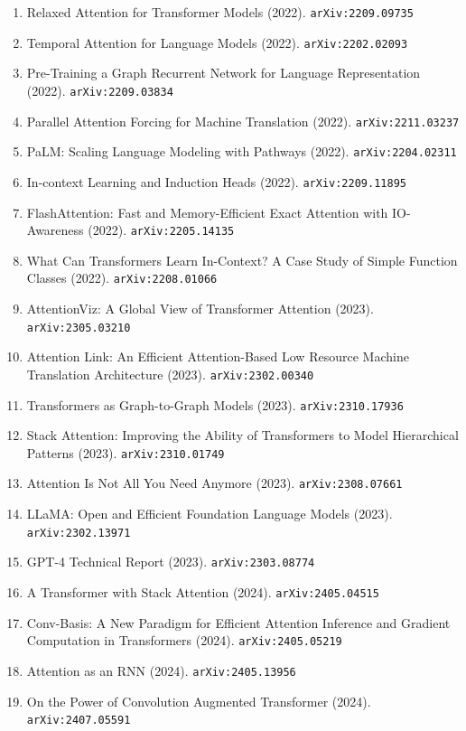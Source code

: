 \documentclass[11pt]{article}
\begin{document}
\begin{enumerate}
  Speech Translation (2022). \texttt{arXiv:2205.07100}
  \item Relaxed Attention for Transformer Models (2022). \texttt{arXiv:2209.09735}
  \item Temporal Attention for Language Models (2022). \texttt{arXiv:2202.02093}
  \item Pre-Training a Graph Recurrent Network for Language Representation (2022). \texttt{arXiv:2209.03834}
  \item Parallel Attention Forcing for Machine Translation (2022). \texttt{arXiv:2211.03237}
  \item PaLM: Scaling Language Modeling with Pathways (2022). \texttt{arXiv:2204.02311}
  \item In-context Learning and Induction Heads (2022). \texttt{arXiv:2209.11895}
  \item FlashAttention: Fast and Memory-Efficient Exact Attention with
  IO-Awareness (2022). \texttt{arXiv:2205.14135}
  \item What Can Transformers Learn In-Context? A Case Study of Simple Function
  Classes (2022). \texttt{arXiv:2208.01066}
  \item AttentionViz: A Global View of Transformer Attention (2023). \texttt{arXiv:2305.03210}
  \item Attention Link: An Efficient Attention-Based Low Resource Machine
  Translation Architecture (2023). \texttt{arXiv:2302.00340}
  \item Transformers as Graph-to-Graph Models (2023). \texttt{arXiv:2310.17936}
  \item Stack Attention: Improving the Ability of Transformers to Model
  Hierarchical Patterns (2023). \texttt{arXiv:2310.01749}
  \item Attention Is Not All You Need Anymore (2023). \texttt{arXiv:2308.07661}
  \item LLaMA: Open and Efficient Foundation Language Models (2023). \texttt{arXiv:2302.13971}
  \item GPT-4 Technical Report (2023). \texttt{arXiv:2303.08774}
  \item A Transformer with Stack Attention (2024). \texttt{arXiv:2405.04515}
  \item Conv-Basis: A New Paradigm for Efficient Attention Inference and
  Gradient Computation in Transformers (2024). \texttt{arXiv:2405.05219}
  \item Attention as an RNN (2024). \texttt{arXiv:2405.13956}
  \item On the Power of Convolution Augmented Transformer (2024). \texttt{arXiv:2407.05591}

\end{enumerate}
\end{document}
